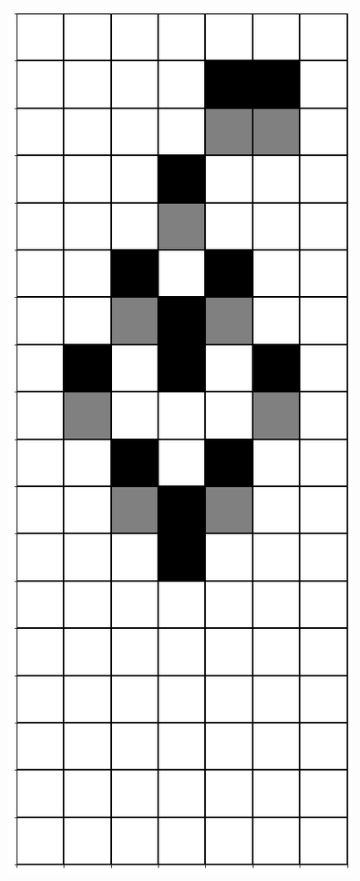 \documentclass[12pt]{article}
\numberwithin{figure}{section} %
\begin{document}
\begin{figure}[H]
\begin{subfigure}{0.19\textwidth}
     \subcaption{}
   \end{subfigure}
           \begin{subfigure}{0.19\textwidth}
     \centering
     \includegraphics[width=\linewidth]{Section4/18.4}
     \subcaption{}
   \end{subfigure}
      \newline
   \setcounter{subfigure}{0}
   

\end{figure}
\end{document}
